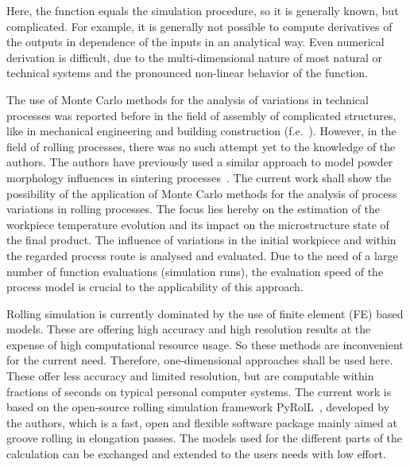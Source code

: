 Here, the function equals the simulation procedure, so it is generally known, but complicated.
For example, it is generally not possible to compute derivatives of the outputs in dependence of the inputs in an analytical way.
Even numerical derivation is difficult, due to the multi-dimensional nature of most natural or technical systems and the pronounced non-linear behavior of the function.

The use of Monte Carlo methods for the analysis of variations in technical processes was reported before in the field of assembly of complicated structures, like in mechanical engineering and building construction (f.e.~\cite{Lin1997, Shen2005, Dantan2009, Qureshi2012, Yan2015, Rausch2019}).
However, in the field of rolling processes, there was no such attempt yet to the knowledge of the authors.
The authors have previously used a similar approach to model powder morphology influences in sintering processes~\cite{Weiner2022, Weiner2022b}.
The current work shall show the possibility of the application of Monte Carlo methods for the analysis of process variations in rolling processes.
The focus lies hereby on the estimation of the workpiece temperature evolution and its impact on the microstructure state of the final product.
The influence of variations in the initial workpiece and within the regarded process route is analysed and evaluated.
Due to the need of a large number of function evaluations (simulation runs), the evaluation speed of the process model is crucial to the applicability of this approach.

Rolling simulation is currently dominated by the use of finite element (FE) based models.
These are offering high accuracy and high resolution results at the expense of high computational resource usage.
So these methods are inconvenient for the current need.
Therefore, one-dimensional approaches shall be used here.
These offer less accuracy and limited resolution, but are computable within fractions of seconds on typical personal computer systems.
The current work is based on the open-source rolling simulation framework PyRolL~\cite{pyroll_jors}, developed by the authors, which is a fast, open and flexible software package mainly aimed at groove rolling in elongation passes.
The models used for the different parts of the calculation can be exchanged and extended to the users needs with low effort.

